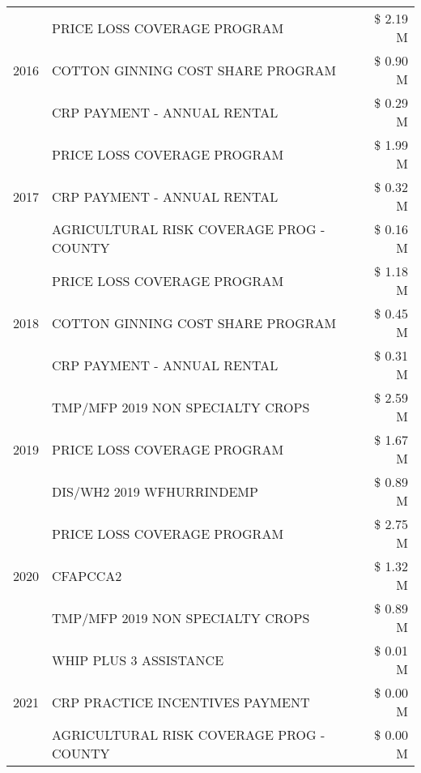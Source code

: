 \begin{tabular}{llr}
\multirow[t]{3}{*}{2016} & PRICE LOSS COVERAGE PROGRAM                   & \$ 2.19 M \\
 & COTTON GINNING COST SHARE PROGRAM             & \$ 0.90 M \\
 & CRP PAYMENT - ANNUAL RENTAL                   & \$ 0.29 M \\
\cline{1-3}
\multirow[t]{3}{*}{2017} & PRICE LOSS COVERAGE PROGRAM & \$ 1.99 M \\
 & CRP PAYMENT - ANNUAL RENTAL & \$ 0.32 M \\
 & AGRICULTURAL RISK COVERAGE PROG - COUNTY & \$ 0.16 M \\
\cline{1-3}
\multirow[t]{3}{*}{2018} & PRICE LOSS COVERAGE PROGRAM & \$ 1.18 M \\
 & COTTON GINNING COST SHARE PROGRAM & \$ 0.45 M \\
 & CRP PAYMENT - ANNUAL RENTAL & \$ 0.31 M \\
\cline{1-3}
\multirow[t]{3}{*}{2019} & TMP/MFP 2019 NON SPECIALTY CROPS & \$ 2.59 M \\
 & PRICE LOSS COVERAGE PROGRAM & \$ 1.67 M \\
 & DIS/WH2 2019 WFHURRINDEMP & \$ 0.89 M \\
\cline{1-3}
\multirow[t]{3}{*}{2020} & PRICE LOSS COVERAGE PROGRAM & \$ 2.75 M \\
 & CFAPCCA2 & \$ 1.32 M \\
 & TMP/MFP 2019 NON SPECIALTY CROPS & \$ 0.89 M \\
\cline{1-3}
\multirow[t]{3}{*}{2021} & WHIP PLUS 3 ASSISTANCE & \$ 0.01 M \\
 & CRP PRACTICE INCENTIVES PAYMENT & \$ 0.00 M \\
 & AGRICULTURAL RISK COVERAGE PROG - COUNTY & \$ 0.00 M \\
\cline{1-3}
\bottomrule
\end{tabular}
